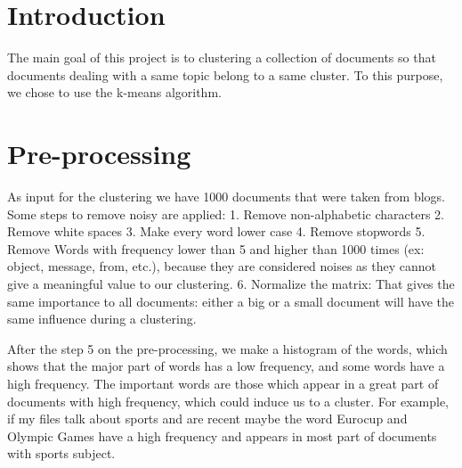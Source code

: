 \documentclass[a4paper,11pt]{article}
\begin{document}
\titleTMB 
\newpage
\tableofcontents
\listoffigures
\newpage

\section{Introduction}
The main goal of this project is to clustering a collection of documents so that documents dealing with a same topic belong to a same cluster.
To this purpose, we chose to use the k-means algorithm.

\section{Pre-processing}
 As  input for  the  clustering we  have  1000 documents  that  were taken  from
 blogs. Some steps to remove noisy are applied: 
1. Remove non-alphabetic characters
2. Remove white spaces
3. Make every word lower case
4. Remove stopwords
5. Remove Words with frequency lower than 5 and higher than 1000 times (ex:
object, message, from, etc.), because  they are considered noises as they cannot
give a meaningful value to our clustering.
6. Normalize the matrix: That  gives the same importance
to all documents: either a big or  a small document will have the same influence
during a clustering.

After the step 5 on the pre-processing, we make a histogram of the words, which shows that the
major part of words has a low frequency, and some words have a high frequency.
The important words are those which appear in a great part of
documents with high frequency, which could induce us to a cluster.
For  example, if  my files  talk about  sports and  are recent  maybe  the word
Eurocup and  Olympic Games have  a high frequency  and appears in most  part of
documents with sports subject. 
\end{document}
